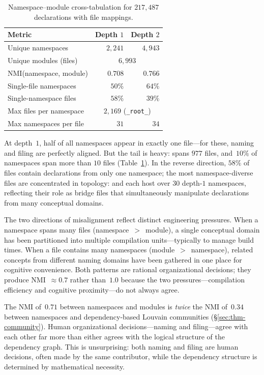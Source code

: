 \begin{table}[ht]
\centering
\caption{Namespace--module cross-tabulation for $217{,}487$ declarations with file mappings.}
\label{tab:ns-mod-cross}
\begin{tabular}{lrr}
\toprule
Metric & Depth $1$ & Depth $2$ \\
\midrule
Unique namespaces              & $2{,}241$  & $4{,}943$ \\
Unique modules (files)         & \multicolumn{2}{c}{$6{,}993$} \\
NMI(namespace, module)         & $0.708$    & $0.766$ \\
Single-file namespaces         & $50\%$     & $64\%$ \\
Single-namespace files         & $58\%$     & $39\%$ \\
Max files per namespace        & \multicolumn{2}{c}{$2{,}169$ (\texttt{\_root\_})} \\
Max namespaces per file        & $31$       & $34$ \\
\bottomrule
\end{tabular}
\end{table}

At depth~$1$, half of all namespaces appear in exactly one file---for these, naming and filing are perfectly aligned. But the tail is heavy:  spans $977$ files, and~$10\%$ of namespaces span more than $10$ files (Table~\ref{tab:ns-mod-cross}). In the reverse direction, $58\%$ of files contain declarations from only one namespace; the most namespace-diverse files are concentrated in topology:  and  each host over $30$ depth-$1$ namespaces, reflecting their role as bridge files that simultaneously manipulate declarations from many conceptual domains.

The two directions of misalignment reflect distinct engineering pressures. When a namespace spans many files (namespace~$>$~module), a single conceptual domain has been partitioned into multiple compilation units---typically to manage build times. When a file contains many namespaces (module~$>$~namespace), related concepts from different naming domains have been gathered in one place for cognitive convenience. Both patterns are rational organizational decisions; they produce NMI~$\approx 0.7$ rather than~$1.0$ because the two pressures---compilation efficiency and cognitive proximity---do not always agree.

\begin{remark}
\label{rem:two-pressures}
The NMI of~$0.71$ between namespaces and modules is \emph{twice} the NMI of~$0.34$ between namespaces and dependency-based Louvain communities (\S\ref{sec:thm-community}). Human organizational decisions---naming and filing---agree with each other far more than either agrees with the logical structure of the dependency graph. This is unsurprising: both naming and filing are human decisions, often made by the same contributor, while the dependency structure is determined by mathematical necessity.
\end{remark}


